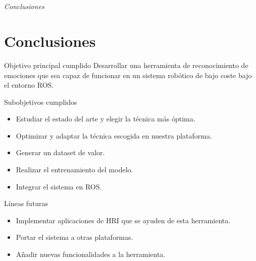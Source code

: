 \documentclass{beamer}
\begin{document}
\section*{}
\begin{frame}{}
  \centering \Huge
  \emph{Conclusiones}
\end{frame}

\section{Conclusiones}
\begin{frame}
\begin{block}{Objetivo principal cumplido}
Desarrollar una herramienta de reconocimiento de emociones que sea capaz de funcionar en un sistema robótico de bajo coste bajo el entorno ROS.
\end{block}

\begin{block}{Subobjetivos cumplidos}
\begin{itemize}
    \item Estudiar el estado del arte y elegir la técnica más óptima.
    \item Optimizar y adaptar la técnica escogida en nuestra plataforma.
    \item Generar un dataset de valor.
    \item Realizar el entrenamiento del modelo.
    \item Integrar el sistema en ROS.
\end{itemize}
\end{block}
\end{frame}

\begin{frame}
\begin{block}{Líneas futuras}
\begin{itemize}
\item Implementar aplicaciones de HRI que se ayuden de esta herramienta.
\item Portar el sistema a otras plataformas.
\item Añadir nuevas funcionalidades a la herramienta.
\end{itemize}
\end{block}
\end{frame}

\begin{frame}[plain]
\large{\titlepage}
\end{frame}
\end{document}
